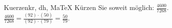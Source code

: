 \begin{MAufgabe}{Kuerzen}{kr, dh, MaTeX}
K\"urzen Sie soweit m\"oglich: $\frac{4600}{7268}$.\\ 
\ifLsg\MLoesung
\quad $\frac{4600}{7268}=\frac{(92)\cdot(50)}{(92)\cdot(79)}=\frac{50}{79}$.\else\relax\fi
 \end{MAufgabe}